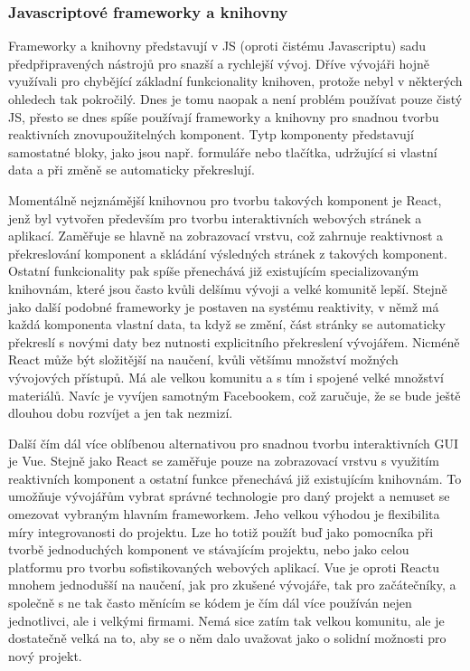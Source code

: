 		\subsubsection{Javascriptové frameworky a knihovny}

		Frameworky a knihovny představují v \ac{JS} (oproti čistému Javascriptu) sadu předpřipravených nástrojů pro snazší a rychlejší vývoj.
		Dříve vývojáři hojně využívali pro chybějící základní funkcionality knihoven, protože nebyl v některých ohledech tak
		pokročilý.
		Dnes je tomu naopak a není problém používat pouze čistý \ac{JS}, přesto se dnes spíše
		používají frameworky a knihovny pro snadnou tvorbu reaktivních znovupoužitelných komponent.
		Tytp komponenty představují samostatné bloky, jako jsou např. formuláře nebo tlačítka, udržující si vlastní
		data a při změně se automaticky překreslují.

		Momentálně nejznámější knihovnou pro tvorbu takových komponent je React, jenž
		byl vytvořen především pro tvorbu interaktivních  webových stránek a
		aplikací.
		Zaměřuje se hlavně na zobrazovací vrstvu, což zahrnuje reaktivnost a překreslování komponent a skládání
		výsledných stránek z takových komponent.
		Ostatní funkcionality pak spíše přenechává již existujícím specializovaným knihovnám, které jsou
		často kvůli delšímu vývoji a velké komunitě lepší.
		Stejně jako další podobné frameworky je postaven na systému reaktivity, v němž má každá komponenta vlastní data,
		ta když se změní, část stránky se automaticky překreslí s novými daty bez nutnosti explicitního překreslení
		vývojářem.
		Nicméně React může být složitější na naučení, kvůli většímu množství možných vývojových přístupů.
		Má ale velkou komunitu a s tím i spojené velké množství materiálů.
		Navíc je vyvíjen samotným Facebookem, což zaručuje, že se bude ještě dlouhou dobu rozvíjet a jen tak
		nezmizí. \cite{react}

		Další čím dál více oblíbenou alternativou pro snadnou tvorbu interaktivních \Ac{GUI} je Vue.
		Stejně jako React se zaměřuje pouze na zobrazovací vrstvu s využitím reaktivních komponent a ostatní
		funkce přenechává již existujícím knihovnám.
		To umožňuje vývojářům vybrat správné technologie pro daný projekt a nemuset se omezovat vybraným hlavním frameworkem.
		Jeho velkou výhodou je flexibilita míry integrovanosti do projektu.
		Lze ho totiž použít buď jako pomocníka při tvorbě jednoduchých komponent ve stávajícím projektu, nebo jako
		celou platformu pro tvorbu sofistikovaných webových aplikací. \cite{vue_guide}
		Vue je oproti Reactu mnohem jednodušší na naučení, jak pro zkušené vývojáře, tak pro začátečníky, a společně
		s ne tak často měnícím se kódem je čím dál více používán nejen
		jednotlivci, ale i velkými firmami.
		Nemá sice zatím tak velkou komunitu, ale je dostatečně velká na to, aby se o něm dalo uvažovat
		jako o solidní možnosti pro nový projekt. \cite{vue_vs_react}

